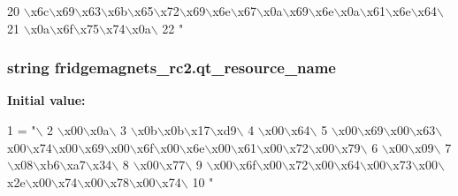 \begin{DoxyCode}
20 \textcolor{stringliteral}{\(\backslash\)x6c\(\backslash\)x69\(\backslash\)x63\(\backslash\)x6b\(\backslash\)x65\(\backslash\)x72\(\backslash\)x69\(\backslash\)x6e\(\backslash\)x67\(\backslash\)x0a\(\backslash\)x69\(\backslash\)x6e\(\backslash\)x0a\(\backslash\)x61\(\backslash\)x6e\(\backslash\)x64\(\backslash\)}
21 \textcolor{stringliteral}{\(\backslash\)x0a\(\backslash\)x6f\(\backslash\)x75\(\backslash\)x74\(\backslash\)x0a\(\backslash\)}
22 \textcolor{stringliteral}{"}
\end{DoxyCode}
\hypertarget{namespacefridgemagnets__rc2_ab65faf4f012ec19d5b3d119c63591d1f}{}
\subsubsection[{qt\+\_\+resource\+\_\+name}]{\setlength{\rightskip}{0pt plus 5cm}string fridgemagnets\+\_\+rc2.\+qt\+\_\+resource\+\_\+name}\label{namespacefridgemagnets__rc2_ab65faf4f012ec19d5b3d119c63591d1f}
{\bfseries Initial value\+:}
\begin{DoxyCode}
1 = \textcolor{stringliteral}{"\(\backslash\)}
2 \textcolor{stringliteral}{\(\backslash\)x00\(\backslash\)x0a\(\backslash\)}
3 \textcolor{stringliteral}{\(\backslash\)x0b\(\backslash\)x0b\(\backslash\)x17\(\backslash\)xd9\(\backslash\)}
4 \textcolor{stringliteral}{\(\backslash\)x00\(\backslash\)x64\(\backslash\)}
5 \textcolor{stringliteral}{\(\backslash\)x00\(\backslash\)x69\(\backslash\)x00\(\backslash\)x63\(\backslash\)x00\(\backslash\)x74\(\backslash\)x00\(\backslash\)x69\(\backslash\)x00\(\backslash\)x6f\(\backslash\)x00\(\backslash\)x6e\(\backslash\)x00\(\backslash\)x61\(\backslash\)x00\(\backslash\)x72\(\backslash\)x00\(\backslash\)x79\(\backslash\)}
6 \textcolor{stringliteral}{\(\backslash\)x00\(\backslash\)x09\(\backslash\)}
7 \textcolor{stringliteral}{\(\backslash\)x08\(\backslash\)xb6\(\backslash\)xa7\(\backslash\)x34\(\backslash\)}
8 \textcolor{stringliteral}{\(\backslash\)x00\(\backslash\)x77\(\backslash\)}
9 \textcolor{stringliteral}{\(\backslash\)x00\(\backslash\)x6f\(\backslash\)x00\(\backslash\)x72\(\backslash\)x00\(\backslash\)x64\(\backslash\)x00\(\backslash\)x73\(\backslash\)x00\(\backslash\)x2e\(\backslash\)x00\(\backslash\)x74\(\backslash\)x00\(\backslash\)x78\(\backslash\)x00\(\backslash\)x74\(\backslash\)}
10 \textcolor{stringliteral}{"}
\end{DoxyCode}
\hypertarget{namespacefridgemagnets__rc2_ae36234a2697fccc2f5c7b491c5dbe6a9}{}
